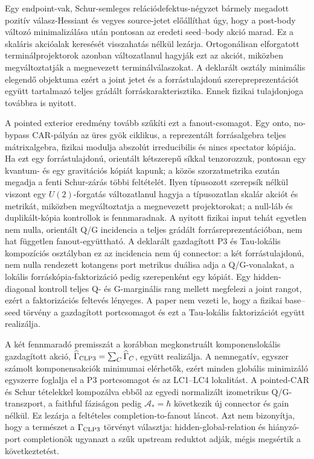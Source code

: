 \documentclass[12pt]{article}
\begin{document}
Egy endpoint-vak, Schur-semleges relációdefektus-négyzet bármely megadott
pozitív válasz-Hessiant és vegyes source-jetet előállíthat úgy, hogy a post-body
változó minimalizálása után pontosan az eredeti seed--body akció marad.  Ez a
skaláris akcióalak keresését visszahatás nélkül lezárja.  Ortogonálisan
elforgatott terminálprojektorok azonban változatlanul hagyják ezt az akciót,
miközben megváltoztatják a megnevezett terminálválaszokat.  A deklarált
osztály minimális elegendő objektuma ezért a joint jetet és a forrástulajdonú
szerepreprezentációt együtt tartalmazó teljes grádált forráskarakterisztika.
Ennek fizikai tulajdonjoga továbbra is nyitott.

A pointed exterior eredmény tovább szűkíti ezt a fanout-csomagot. Egy onto,
no-bypass CAR-pályán az üres gyök ciklikus, a reprezentált forrásalgebra teljes
mátrixalgebra, fizikai modulja abszolút irreducibilis és nincs spectator
kópiája. Ha ezt egy forrástulajdonú, orientált kétszerepű síkkal tenzorozzuk,
pontosan egy kvantum- és egy gravitációs kópiát kapunk; a közös szorzatmetrika
ezután megadja a fenti Schur-zárás többi feltételét. Ilyen típusozott szerepsík
nélkül viszont egy $U(2)$-forgatás változatlanul hagyja a típusozatlan skalár
akciót és metrikát, miközben megváltoztatja a megnevezett projektorokat; a
null-láb és duplikált-kópia kontrollok is fennmaradnak. A nyitott fizikai input
tehát egyetlen nem nulla, orientált Q/G incidencia a teljes grádált
forrásreprezentációban, nem hat független fanout-együttható. A deklarált
gazdagított P3 és Tau-lokális kompozíciós osztályban ez az incidencia nem új
connector: a két forrástulajdonú, nem nulla rendezett kotangens port metrikus
duálisa adja a Q/G-vonalakat, a lokális forráskópia-faktorizáció pedig
szerepenként egy kópiát. Egy hidden-diagonal kontroll teljes Q- és G-marginális
rang mellett megfelezi a joint rangot, ezért a faktorizációs feltevés
lényeges. A paper nem vezeti le, hogy a fizikai base--seed törvény a
gazdagított portcsomagot és ezt a Tau-lokális faktorizációt együtt realizálja.

A két fennmaradó premisszát a korábban megkonstruált komponenslokális
gazdagított akció,
$\widehat\Gamma_{\rm CLP3}=\sum_C\widehat\Gamma_C$, együtt realizálja. A
nemnegatív, egyszer számolt komponensakciók minimumai elérhetők, ezért minden
globális minimizáló egyszerre foglalja el a P3 portcsomagot és az LC1--LC4
lokalitást. A pointed-CAR és Schur tételekkel kompozálva ebből az egyedi
normalizált izometrikus Q/G-transzport, a faithful fáziságon pedig
$\mathcal A_*=\hbar$ következik új connector és gain nélkül. Ez lezárja a
feltételes completion-to-fanout láncot. Azt nem bizonyítja, hogy a természet a
$\Gamma_{\rm CLP3}$ törvényt választja: hidden-global-relation és hiányzó-port
completionök ugyanazt a szűk upstream reduktot adják, mégis megsértik a
következtetést.
\end{document}
